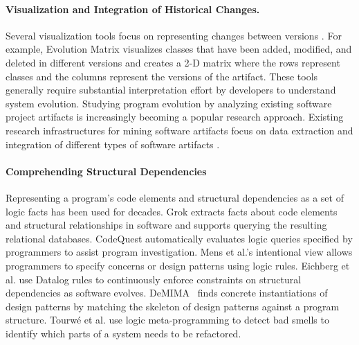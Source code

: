 \documentclass[runningheads,a4paper]{llncs}
\begin{document}
\paragraph{Visualization and Integration of Historical Changes.} 
Several visualization tools focus on representing changes between versions \cite{Ball1996, Eick2002, Girba2004, Holt1996, Lanza2001, Lanza2003, Rysselberghe2004a}. For example, Evolution Matrix \cite{Lanza2001} visualizes classes that have been added, modified, and deleted in different versions and creates a 2-D matrix where the rows represent classes and the columns represent the versions of the artifact. These tools generally require substantial interpretation effort by developers to understand system evolution. Studying program evolution by analyzing existing software project artifacts is increasingly becoming a popular research approach. Existing research infrastructures for mining software artifacts focus on data extraction \cite{Bevan2005, Fischer2003} and integration of different types of software artifacts \cite{Cubranic2003, Venolia2006:bridge, Sarma2009:tesseract, Begel2010:codebook}. 

\paragraph{Comprehending Structural Dependencies} 
Representing a program's code elements and structural dependencies as a set of logic facts has been used for decades. Grok \cite{Holt1998} extracts facts about code elements and structural relationships in software and supports querying the resulting relational databases. CodeQuest \cite{Hajiyev2006} automatically evaluates logic queries specified by programmers to assist program investigation. Mens et al.'s intentional view \cite{Mens2002b} allows programmers to specify concerns or design patterns using logic rules. Eichberg et al. \cite{Eichberg2008} use Datalog rules to continuously enforce constraints on structural dependencies as software evolves. DeMIMA~\cite{Gueheneuc2008:demima} finds concrete instantiations of design patterns by matching the skeleton of design patterns against a program structure. Tourw{\'e} {et al.} \cite{Tourwe01} use logic meta-programming to detect bad smells to identify which parts of a system needs to be refactored.
\end{document}

